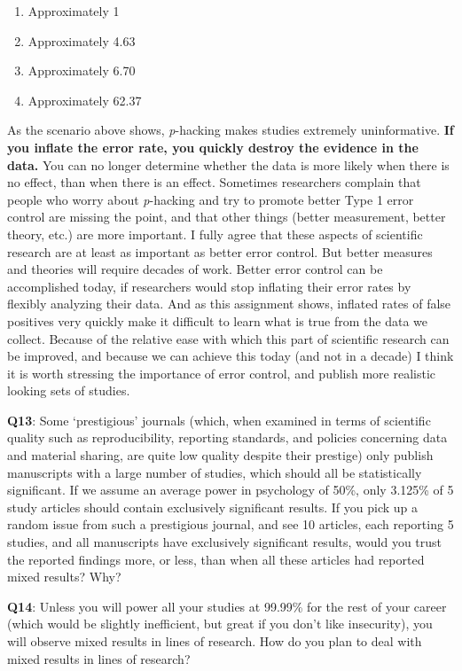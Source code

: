 \documentclass[
  oneside]{krantz}
\providecommand{\tightlist}{%
  \setlength{\itemsep}{0pt}\setlength{\parskip}{0pt}}
\begin{document}
\begin{enumerate}
\def\labelenumi{\Alph{enumi})}
\tightlist
\item
  Approximately 1
\item
  Approximately 4.63
\item
  Approximately 6.70
\item
  Approximately 62.37
\end{enumerate}

As the scenario above shows, \emph{p}-hacking makes studies extremely uninformative.
\textbf{If you inflate the error rate, you quickly destroy the evidence in the data.} You can no longer determine whether the data is more likely when there is no effect, than when there is an effect. Sometimes researchers complain that people who worry about \emph{p}-hacking and try to promote better Type 1 error control are missing the point, and that other things (better measurement, better theory, etc.) are more important. I fully agree that these aspects of scientific research are at least as important as better error control. But better measures and theories will require decades of work. Better error control can be accomplished today, if researchers would stop inflating their error rates by flexibly analyzing their data. And as this assignment shows, inflated rates of false positives very quickly make it difficult to learn what is true from the data we collect. Because of the relative ease with which this part of scientific research can be improved, and because we can achieve this today (and not in a decade) I think it is worth stressing the importance of error control, and publish more realistic looking sets of studies.

\textbf{Q13}: Some `prestigious' journals (which, when examined in terms of scientific quality such as reproducibility, reporting standards, and policies concerning data and material sharing, are quite low quality despite their prestige) only publish manuscripts with a large number of studies, which should all be statistically significant. If we assume an average power in psychology of 50\%, only 3.125\% of 5 study articles should contain exclusively significant results. If you pick up a random issue from such a prestigious journal, and see 10 articles, each reporting 5 studies, and all manuscripts have exclusively significant results, would you trust the reported findings more, or less, than when all these articles had reported mixed results? Why?

\textbf{Q14}: Unless you will power all your studies at 99.99\% for the rest of your career (which would be slightly inefficient, but great if you don't like insecurity), you will observe mixed results in lines of research. How do you plan to deal with mixed results in lines of research?
\end{document}
